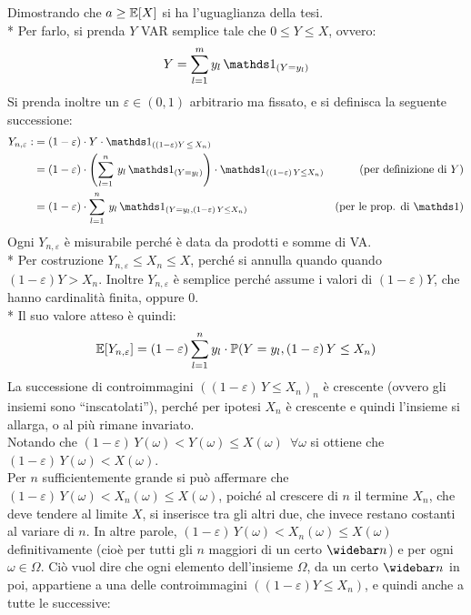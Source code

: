 \begin{dimo}
  Dimostrando che $a \ge \mathbb E[X]$ si ha l'uguaglianza della tesi. \\*
  Per farlo, si prenda $Y$ VAR semplice tale che $0 \le Y \le X$, ovvero:
  $$Y = \sum\limits_{l=1}^m y_l \, \Ind_{(Y=y_l)}$$
  Si prenda inoltre un $\varepsilon \in (0,1)$ arbitrario ma fissato, e si definisca la seguente successione:
  \begin{align*}
	Y_{n,\varepsilon} :&= (1 - \varepsilon) \cdot Y \cdot \Ind_{\left((1-\varepsilon) Y \, \le \, X_n\right)} &\\
	&= (1-\varepsilon) \cdot \left(\sum\limits_{l=1}^n \, y_l \, \Ind_{(Y=y_l)}\right) \cdot \Ind_{\left((1 - \varepsilon) \, Y \le X_n\right)} &\text{(per definizione di $Y$)}\\
	&= (1-\varepsilon) \cdot \sum\limits_{l=1}^n \, y_l \, \Ind_{(Y=y_l, (1 - \varepsilon) \, Y \le X_n)} &\text{(per le prop. di $\Ind$)}
	\end{align*}
  Ogni $Y_{n,\varepsilon}$ è misurabile perché è data da prodotti e somme di VA.\\*
  Per costruzione $Y_{n,\varepsilon} \le X_n \le X$, perché si annulla quando quando $(1-\varepsilon)Y > X_n$.
  Inoltre $Y_{n,\varepsilon}$ è semplice perché assume i valori di $(1-\varepsilon)Y$, che hanno cardinalità finita, oppure 0. \\*
  Il suo valore atteso è quindi:
  $$
    \mathbb E[Y_{n, \varepsilon}]
    = (1 - \varepsilon) \sum\limits_{l=1}^n y_l \cdot
      \mathbb P(Y=y_l, (1 - \varepsilon) \, Y \le X_n)
  $$
  La successione di controimmagini $((1 - \varepsilon) \, Y \le X_n)_n$ è crescente (ovvero gli insiemi sono ``inscatolati''), perché per ipotesi $X_n$ è crescente e quindi l'insieme si allarga, o al più rimane invariato. \\
  Notando che $(1 - \varepsilon)\,Y(\omega) < Y(\omega) \le X(\omega) \enspace \forall \omega$ si ottiene che $(1 - \varepsilon)\,Y(\omega) < X(\omega)$.\\
  Per $n$ sufficientemente grande si può affermare che $(1 - \varepsilon)\,Y(\omega) < X_n(\omega) \le X(\omega)$, poiché al crescere di $n$ il termine $X_n$, che deve tendere al limite $X$, si inserisce tra gli altri due, che invece restano costanti al variare di $n$.
  In altre parole, $(1 - \varepsilon)\,Y(\omega) < X_n(\omega) \le X(\omega)$ definitivamente (cioè per tutti gli $n$ maggiori di un certo $\widebar n$) e per ogni $\omega \in \Omega$.
  Ciò vuol dire che ogni elemento dell'insieme $\Omega$, da un certo $\widebar n$ in poi, appartiene a una delle controimmagini $((1-\varepsilon)Y \le X_n)$, e quindi anche a tutte le successive:

\end{dimo}
